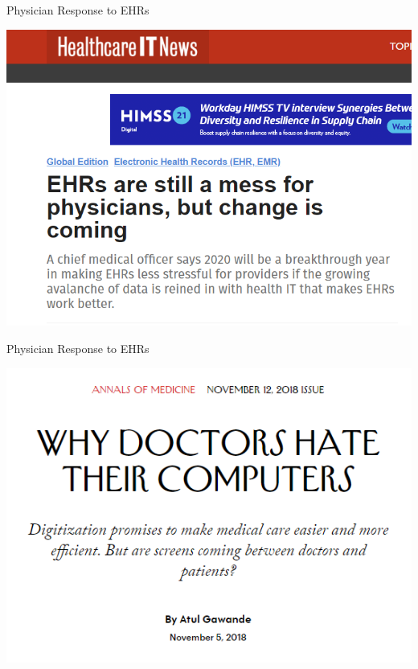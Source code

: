 \documentclass[10pt]{beamer}
\begin{document}
\begin{frame}[noframenumbering]{Physician Response to EHRs}
\begin{center}
    \includegraphics[scale=.4]{graphics/News Clip1.PNG}
\end{center}
\end{frame}

\begin{frame}[noframenumbering]{Physician Response to EHRs}
\begin{center}
    \includegraphics[scale=.5]{graphics/News Clip2.PNG}
\end{center}
\end{frame}
\end{document}
